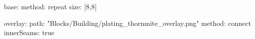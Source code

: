 base:
  method: repeat
  size: [8,8]

overlay:
  path: "Blocks/Building/plating_thornmite_overlay.png"
  method: connect
  innerSeams: true
